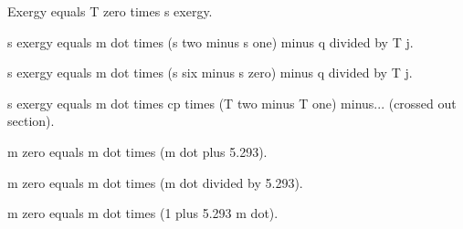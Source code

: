 Exergy equals T zero times s exergy.  

s exergy equals m dot times (s two minus s one) minus q divided by T j.  

s exergy equals m dot times (s six minus s zero) minus q divided by T j.  

s exergy equals m dot times cp times (T two minus T one) minus... (crossed out section).  

m zero equals m dot times (m dot plus 5.293).  

m zero equals m dot times (m dot divided by 5.293).  

m zero equals m dot times (1 plus 5.293 m dot).